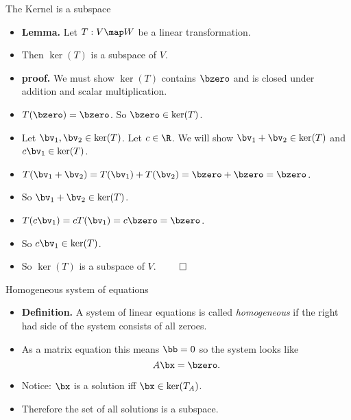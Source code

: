 \documentclass{beamer}
\begin{document}
\begin{frame}{The Kernel is a subspace}

\begin{itemize}
\item \textbf{Lemma.} Let $T:V\map W$ be a linear transformation.
\item Then $\ker(T)$ is a subspace of $V$.
\item \textbf{proof.} We must show $\ker(T)$ contains $\bzero$ and is closed
under addition and scalar multiplication.
\item $T(\bzero) = \bzero$. So $\bzero\in\ker(T)$.
\item Let $\bv_1,\bv_2\in\ker(T)$. Let $c\in\R$. We will show $\bv_1+\bv_2\in\ker(T)$ and $c\bv_1\in\ker(T)$.
\item $T(\bv_1+\bv_2)=T(\bv_1) + T(\bv_2) = \bzero + \bzero = \bzero$.
\item So $\bv_1+\bv_2\in\ker(T)$.
\item $T(c\bv_1)=cT(\bv_1)=c\bzero=\bzero$.
\item So $c\bv_1\in\ker(T)$.
\item So $\ker(T)$ is a subspace of $V$. $\qed$
\end{itemize}

\end{frame}


\begin{frame}{Homogeneous system of equations}

\begin{itemize}
\item \textbf{Definition.} A system of linear equations is called
\emph{homogeneous} if the right had side of the system consists of all zeroes.
\item As a matrix equation this means $\bb=0$ so the system looks like
$$A\bx=\bzero.$$
\item Notice: $\bx$ is a solution iff $\bx\in\ker(T_A)$.
\item Therefore the set of all solutions is a subspace.
\end{itemize}

\end{frame}

\end{document}
